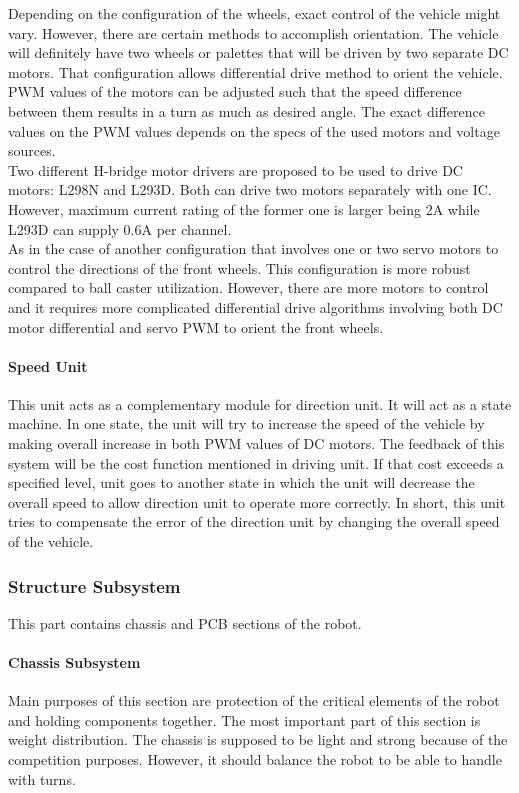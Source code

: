 \documentclass[a4paper,12pt]{article}
\begin{document}
			Depending on the configuration of the wheels, exact control of the vehicle might vary. However, there are certain methods to accomplish orientation. The vehicle will definitely have two wheels or palettes that will be driven by two separate DC motors. That configuration allows differential drive method to orient the vehicle. PWM values of the motors can be adjusted such that the speed difference between them results in a turn as much as desired angle. The exact difference values on the PWM values depends on the specs of the used motors and voltage sources. \\

			Two different H-bridge motor drivers are proposed to be used to drive DC motors: L298N and L293D. Both can drive two motors separately with one IC. However, maximum current rating of the former one is larger being 2A while L293D can supply 0.6A per channel. \\

			As in the case of another configuration that involves one or two servo motors to control the directions of the front wheels. This configuration is more robust compared to ball caster utilization. However, there are more motors to control and it requires more complicated differential drive algorithms involving both DC motor differential and servo PWM to orient the front wheels.
		\paragraph{Speed Unit}

		This unit acts as a complementary module for direction unit. It will act as a state machine. In one state, the unit will try to increase the speed of the vehicle by making overall increase in both PWM values of DC motors. The feedback of this  system will be the cost function mentioned in driving unit. If that cost exceeds a specified level, unit goes to another state in which the unit will decrease the overall speed to allow direction unit to operate more correctly. In short, this unit tries to compensate the error of the direction unit by changing the overall speed of the vehicle.
 

	\subsubsection{Structure Subsystem}
		This part contains chassis and PCB sections of the robot. 
		
		\paragraph{Chassis Subsystem}
			Main purposes of this section are protection of the critical elements of the robot and holding components together. The most important part of this section is weight distribution. The chassis is supposed to be light and strong because of the competition purposes. However, it should balance the robot to be able to handle with turns. 
\end{document}

